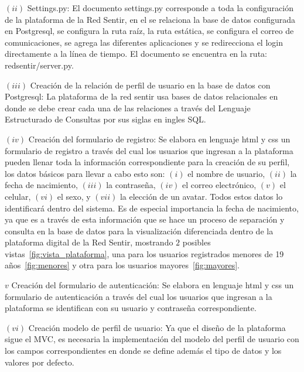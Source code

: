 \documentclass[journal,transmag]{IEEEtran}
\begin{document}
$(ii)$ Settings.py: El documento settings.py corresponde a toda la configuración de la plataforma de la Red Sentir, en el se relaciona la base de datos configurada en Postgresql, se configura la ruta raíz, la ruta estática, se configura el correo de comunicaciones, se agrega las diferentes aplicaciones y se redirecciona el login directamente a la línea de tiempo. El documento se encuentra en la ruta: redsentir/server.py.

$(iii)$ Creación de la relación de perfil de usuario en la base de datos con Postgresql: La plataforma de la red sentir usa bases de datos relacionales en donde se debe crear cada una de las relaciones a través del Lenguaje Estructurado de Consultas por sus siglas en ingles SQL.

$(iv)$ Creación del formulario de registro: Se elabora en lenguaje html y css un formulario de registro a través del cual los usuarios que ingresan a la plataforma pueden llenar toda la información correspondiente para la creación de su perfil, los datos básicos para llevar a cabo esto son: $(i)$ el nombre de usuario, $(ii)$ la fecha de nacimiento, $(iii)$ la contraseña, $(iv)$ el correo electrónico, $(v)$ el celular, $(vi)$ el sexo, y $(vii)$ la elección de un avatar. Todos estos datos lo identificará dentro del sistema. Es de especial importancia la fecha de nacimiento, ya que es a través de esta información que se hace un proceso de separación y consulta en la base de datos para la visualización diferenciada dentro de la plataforma digital de la Red Sentir, mostrando $2$ posibles vistas~\ref{fig:vista_plataforma}, una para los usuarios registrados menores de 19 años~\ref{fig:menores} y otra para los usuarios mayores~\ref{fig:mayores}.

$v$ Creación del formulario de autenticación: Se elabora en lenguaje html y css un formulario de autenticación a través del cual los usuarios que ingresan a la plataforma se identifican con su usuario y contraseña correspondiente.

$(vi)$ Creación modelo de perfil de usuario: Ya que el diseño de la plataforma sigue el MVC, es necesaria la implementación del modelo del perfil de usuario con los campos correspondientes en donde se define además el tipo de datos y los valores por defecto.
\end{document}
